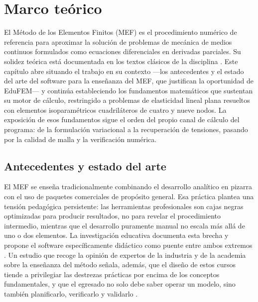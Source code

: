 \chapter{Marco teórico}
\label{cap:marco_teorico}

El Método de los Elementos Finitos (MEF) es el procedimiento numérico de referencia para aproximar la solución de problemas de mecánica de medios continuos formulados como ecuaciones diferenciales en derivadas parciales. Su solidez teórica está documentada en los textos clásicos de la disciplina \autocite{zienkiewicz2013fem,bathe2014fem,cook2002concepts}. Este capítulo abre situando el trabajo en su contexto —los antecedentes y el estado del arte del software para la enseñanza del MEF, que justifican la oportunidad de EduFEM— y continúa estableciendo los fundamentos matemáticos que sustentan su motor de cálculo, restringido a problemas de elasticidad lineal plana resueltos con elementos isoparamétricos cuadriláteros de cuatro y nueve nodos. La exposición de esos fundamentos sigue el orden del propio canal de cálculo del programa: de la formulación variacional a la recuperación de tensiones, pasando por la calidad de malla y la verificación numérica.

\section{Antecedentes y estado del arte}
\label{sec:antecedentes}

El MEF se enseña tradicionalmente combinando el desarrollo analítico en pizarra con el uso de paquetes comerciales de propósito general. Esa práctica plantea una tensión pedagógica persistente: las herramientas profesionales son cajas negras optimizadas para producir resultados, no para revelar el procedimiento intermedio, mientras que el desarrollo puramente manual no escala más allá de uno o dos elementos. La investigación educativa documenta esta brecha y propone el software específicamente didáctico como puente entre ambos extremos \autocite{bishay2020teaching,lee2015interactive,perezsantiago2023fem}. Un estudio que recoge la opinión de expertos de la industria y de la academia sobre la enseñanza del método señala, además, que el diseño de estos cursos tiende a privilegiar las destrezas prácticas por encima de los conceptos fundamentales, y que el egresado no solo debe saber operar un modelo, sino también planificarlo, verificarlo y validarlo \autocite{perezsantiago2023fem}.

